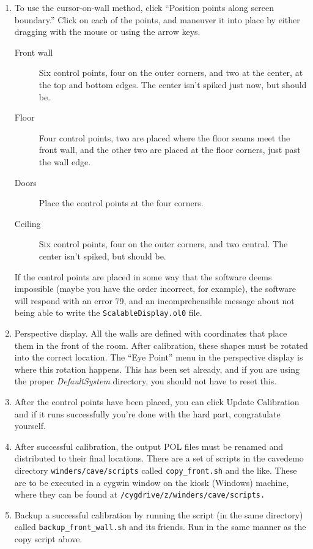 \documentclass[11pt]{article}
\newcommand{\cmd}[1]{\texttt{#1}\xspace}
\newcommand{\dir}[1]{\textit{#1}\xspace}
\newcommand{\menu}[1]{``#1''\xspace}
\newcommand{\button}[1]{\textsf{#1}\xspace}
\begin{document}
\begin{enumerate}
\item To use the cursor-on-wall method, click ``Position points along
  screen boundary.''  Click on each of the points, and maneuver it
  into place by either dragging with the mouse or using the arrow keys.

  \begin{description}

  \item[Front wall] Six control points, four on the outer corners, and
    two at the center, at the top and bottom edges.  The center isn't
    spiked just now, but should be.

  \item[Floor] Four control points, two are placed where the floor
    seams meet the front wall, and the other two are placed at the
    floor corners, just past the wall edge.

  \item[Doors] Place the control points at the four corners.

  \item[Ceiling] Six control points, four on the outer corners, and
    two central.  The center isn't spiked, but should be.

  \end{description}

  If the control points are placed in some way that the software deems
  impossible (maybe you have the order incorrect, for example), the
  software will respond with an error 79, and an incomprehensible
  message about not being able to write the \cmd{ScalableDisplay.ol0} file.

\item Perspective display.  All the walls are defined with coordinates
  that place them in the front of the room.  After calibration, these
  shapes must be rotated into the correct location.  The \menu{Eye Point}
  menu in the perspective display is where this rotation happens.
  This has been set already, and if you are using the proper
  \dir{DefaultSystem} directory, you should not have to reset this.

\item After the control points have been placed, you can click
  \button{Update Calibration} and if it runs successfully you're done with
  the hard part, congratulate yourself.

\item After successful calibration, the output POL files must be
  renamed and distributed to their final locations.  There are a set
  of scripts in the cavedemo directory \cmd{winders/cave/scripts}
  called \cmd{copy\_front.sh} and the like.  These are to be executed in
  a cygwin window on the kiosk (Windows) machine, where they can be
  found at \cmd{/cygdrive/z/winders/cave/scripts.}

\item Backup a successful calibration by running the script (in the
  same directory) called \cmd{backup\_front\_wall.sh} and its friends.
  Run in the same manner as the copy script above.


\end{enumerate}
\end{document}
